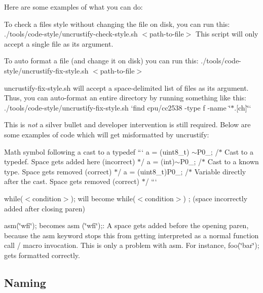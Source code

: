Here are some examples of what you can do\+:
\begin{DoxyItemize}
\item To check a file\textquotesingle{}s style without changing the file on disk, you can run this\+: {\ttfamily ./tools/code-\/style/uncrustify-\/check-\/style.sh $<$path-\/to-\/file$>$} This script will only accept a single file as its argument.
\item To auto format a file (and change it on disk) you can run this\+: {\ttfamily ./tools/code-\/style/uncrustify-\/fix-\/style.sh $<$path-\/to-\/file$>$}
\item {\ttfamily uncrustify-\/fix-\/style.\+sh} will accept a space-\/delimited list of files as its argument. Thus, you can auto-\/format an entire directory by running something like this\+: {\ttfamily ./tools/code-\/style/uncrustify-\/fix-\/style.sh `find cpu/cc2538 -\/type f -\/name \char`\"{}$\ast$.\mbox{[}ch\mbox{]}\char`\"{}`}
\end{DoxyItemize}

This is {\itshape not} a silver bullet and developer intervention is still required. Below are some examples of code which will get misformatted by uncrustify\+:
\begin{DoxyItemize}
\item Math symbol following a cast to a typedef ``` a = (uint8\+\_\+t) $\sim$\+P0\+\_; /$\ast$ Cast to a typedef. Space gets added here (incorrect) $\ast$/ a = (int)$\sim$\+P0\+\_; /$\ast$ Cast to a known type. Space gets removed (correct) $\ast$/ a = (uint8\+\_\+t)P0\+\_; /$\ast$ Variable directly after the cast. Space gets removed (correct) $\ast$/ ```
\item {\ttfamily while($<$condition$>$);} will become {\ttfamily while($<$condition$>$) ;} (space incorrectly added after closing paren)
\item ﻿﻿{\ttfamily asm(\char`\"{}wfi\char`\"{});} becomes {\ttfamily asm (\char`\"{}wfi\char`\"{});}\+: A space gets added before the opening paren, because the {\ttfamily asm} keyword stops this from getting interpreted as a normal function call / macro invocation. This is only a problem with {\ttfamily asm}. For instance, ﻿﻿{\ttfamily foo(\char`\"{}bar\char`\"{});} gets formatted correctly.
\end{DoxyItemize}

\subsection*{Naming }

